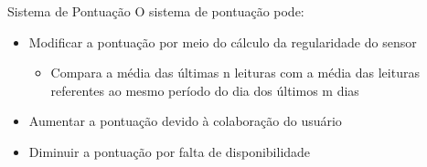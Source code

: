 \documentclass{beamer}
\begin{document}
  \begin{frame}{Sistema de Pontuação}
    \quad O sistema de pontuação pode:
    \begin{itemize}
      \item Modificar a pontuação por meio do cálculo da regularidade do sensor
      \begin{itemize}
        \item Compara a média das últimas n leituras com a média das leituras referentes ao mesmo período do dia dos últimos m dias
      \end{itemize}
      \item Aumentar a pontuação devido à colaboração do usuário
      \item Diminuir a pontuação por falta de disponibilidade
    \end{itemize}
  \end{frame}
\end{document}
